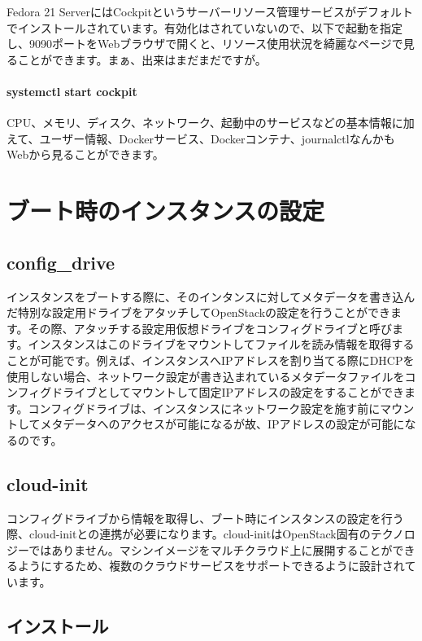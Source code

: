 \documentclass[9pt,b5paper,tombo,openany,dvipdfmx]{jsbook}
\begin{document}
Fedora 21 ServerにはCockpitというサーバーリソース管理サービスがデフォルトでインストールされています。有効化はされていないので、以下で起動を指定し、9090ポートをWebブラウザで開くと、リソース使用状況を綺麗なページで見ることができます。まぁ、出来はまだまだですが。

\subsubsection{systemctl start cockpit}

CPU、メモリ、ディスク、ネットワーク、起動中のサービスなどの基本情報に加えて、ユーザー情報、Dockerサービス、Dockerコンテナ、journalctlなんかもWebから見ることができます。

\chapter{ブート時のインスタンスの設定}

\section{config\_drive}

インスタンスをブートする際に、そのインタンスに対してメタデータを書き込んだ特別な設定用ドライブをアタッチしてOpenStackの設定を行うことができます。その際、アタッチする設定用仮想ドライブをコンフィグドライブと呼びます。インスタンスはこのドライブをマウントしてファイルを読み情報を取得することが可能です。例えば、インスタンスへIPアドレスを割り当てる際にDHCPを使用しない場合、ネットワーク設定が書き込まれているメタデータファイルをコンフィグドライブとしてマウントして固定IPアドレスの設定をすることができます。コンフィグドライブは、インスタンスにネットワーク設定を施す前にマウントしてメタデータへのアクセスが可能になるが故、IPアドレスの設定が可能になるのです。

\section{cloud-init}

コンフィグドライブから情報を取得し、ブート時にインスタンスの設定を行う際、cloud-initとの連携が必要になります。cloud-initはOpenStack固有のテクノロジーではありません。マシンイメージをマルチクラウド上に展開することができるようにするため、複数のクラウドサービスをサポートできるように設計されています。

\section{インストール}
\end{document}
